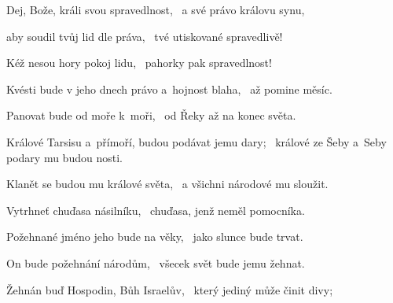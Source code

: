 \begin{psalmus}
 
Dej, Bože, králi svou spravedlnost,~\grestar{}
a své právo královu synu, \Abardot{}

aby soudil tvůj lid dle práva,~\grestar{}
tvé utiskované spravedlivě! \Abardot{}

Kéž nesou hory pokoj lidu,~\grestar{}
pahorky pak spravedlnost! \Abardot{}

Kvésti bude v jeho dnech právo a~hojnost blaha,~\grestar{}
až pomine měsíc. \Abardot{}

Panovat bude od moře k~moři,~\grestar{}
od Řeky až na konec světa. \Abardot{}

Králové Tarsisu a~přímoří, budou podávat jemu dary;~\grestar{}
králové ze Šeby a~Seby podary mu budou nosti. \Abardot{}

Klanět se budou mu králové světa,~\grestar{}
a všichni národové mu sloužit. \Abardot{}

Vytrhneť chuďasa násilníku,~\grestar{}
chuďasa, jenž neměl pomocníka. \Abardot{}

Požehnané jméno jeho bude na věky,~\grestar{}
jako slunce bude trvat. \Abardot{}

On bude požehnání národům,~\grestar{}
všecek svět bude jemu žehnat. \Abardot{}

Žehnán buď Hospodin, Bůh Israelův,~\grestar{}
který jediný může činit divy; \Abardot{}
\end{psalmus}
